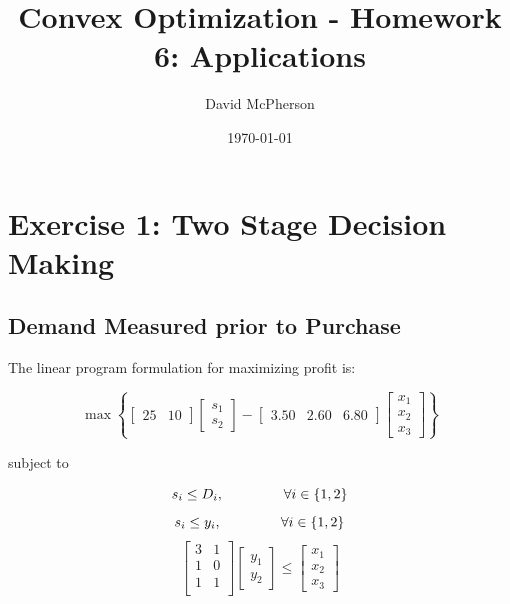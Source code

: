 \documentclass[a4paper]{article}
\title{Convex Optimization - Homework 6: Applications}
\author{David McPherson}
\date{\today}
\begin{document}
\maketitle

\section{Exercise 1: Two Stage Decision Making}
\subsection{Demand Measured prior to Purchase}

The linear program formulation for maximizing profit is:

\begin{equation}
\max \left \{ [\begin{matrix}25 & 10\end{matrix}]\left [\begin{matrix}s_1 \\ s_2 \end{matrix} \right ]
-[\begin{matrix}3.50 & 2.60 & 6.80\end{matrix}] \left [\begin{matrix}x_1 \\ x_2 \\ x_3 \end{matrix} \right ]
\right \}
\end{equation}

subject to

\begin{equation}
s_i \leq D_i , \hspace{15 mm} \forall i \in \{1,2\}
\end{equation}
\begin{equation}
s_i \leq y_i , \hspace{15 mm} \forall i \in \{1,2\}
\end{equation}
\begin{equation}
\left[
\begin{matrix}
3 & 1 \\
1 & 0 \\
1 & 1 \\
\end{matrix}
\right]
\left[\begin{matrix}y_1 \\ y_2\end{matrix}\right]
\leq
\left[\begin{matrix}x_1 \\ x_2 \\ x_3 \end{matrix}\right]
\end{equation}
\end{document}
